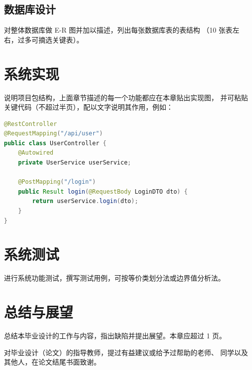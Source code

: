 \documentclass[fandol]{izdthesis}
\begin{document}
\section{数据库设计}
对整体数据库做 E-R 图并加以描述，列出每张数据库表的表结构
（10 张表左右，过多可摘选关键表）。

\chapter{系统实现}
说明项目包结构，上面章节描述的每一个功能都应在本章贴出实现图，
并可粘贴关键代码（不超过半页），配以文字说明其作用，例如：

\begin{lstlisting}[language=Java]
@RestController
@RequestMapping("/api/user")
public class UserController {
    @Autowired
    private UserService userService;

    @PostMapping("/login")
    public Result login(@RequestBody LoginDTO dto) {
        return userService.login(dto);
    }
}
\end{lstlisting}

\chapter{系统测试}
进行系统功能测试，撰写测试用例，可按等价类划分法或边界值分析法。

\chapter{总结与展望}
总结本毕业设计的工作与内容，指出缺陷并提出展望。本章应超过 1 页。


\begin{acknowledgements}
  对毕业设计（论文）的指导教师，提过有益建议或给予过帮助的老师、
  同学以及其他人，在论文结尾书面致谢。
\end{acknowledgements}

\end{document}
